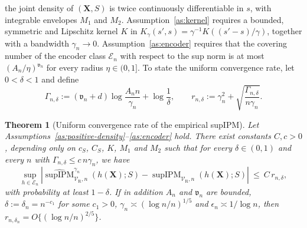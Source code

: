 \documentclass{article} %
\newtheorem{theorem}{Theorem}
\begin{document}
the joint density of $(\mathbf{X},S)$ is twice continuously differentiable in $s$, with integrable envelopes $M_1$ and $M_2$.  Assumption~\ref{as:kernel} requires a bounded, symmetric and Lipschitz kernel $K$ in $K_{\gamma}(s',s)=\gamma^{-1}K((s'-s)/\gamma)$, together with a bandwidth $\gamma_n\to0$.
Assumption~\ref{as:encoder} requires that the covering number of the encoder class $\mathcal{E}_n$
with respect to the sup norm is at most $(A_n/\eta)^{\mathfrak{v}_n}$ for every radius $\eta\in(0,1]$.  
To state the uniform convergence rate, let $0<\delta<1$ and define
\begin{equation}
  \Gamma_{n,\delta}
  :=(\mathfrak{v}_n+d)\log\frac{A_nn}{\gamma_n}+\log\frac{1}{\delta},
  \qquad
  r_{n,\delta}
  :=\gamma_n^2+\sqrt{\frac{\Gamma_{n,\delta}}{n\gamma_n}} .
  \label{eq:rate}
\end{equation}

\begin{theorem}[Uniform convergence rate of the empirical supIPM]
\label{thm:uniform}
Let Assumptions~\ref{as:positive-density}--\ref{as:encoder} hold.  There exist constants $C,c>0$, depending only on $c_S$, $C_S$, $K$, %
$M_1$ and $M_2$ such that for every $\delta\in(0,1)$ and every $n$ with $\Gamma_{n,\delta}\le c\,n\gamma_n$, we have 
\begin{equation}
  \sup_{h\in\mathcal{E}_n}
  \left|\widehat{\operatorname{supIPM}}^{\gamma_n}_{\mathcal{V}_{\mathrm{R}},n}(h(\mathbf{X});S)-\operatorname{supIPM}_{\mathcal{V}_{\mathrm{R}},n}(h(\mathbf{X});S)\right|
  \ \le\ C\,r_{n,\delta},
  \label{eq:uniform}
\end{equation}
with probability at least $1-\delta$.
If in addition $A_n$ and $\mathfrak{v}_n$ are bounded, $\delta:=\delta_n=n^{-c_1}$ for some $c_1>0$, $\gamma_n\asymp(\log n/n)^{1/5}$ and $\epsilon_n\asymp1/\log n$, then $r_{n,\delta_n}=O\{(\log n/n)^{2/5}\}$.
\end{theorem}
\end{document}
